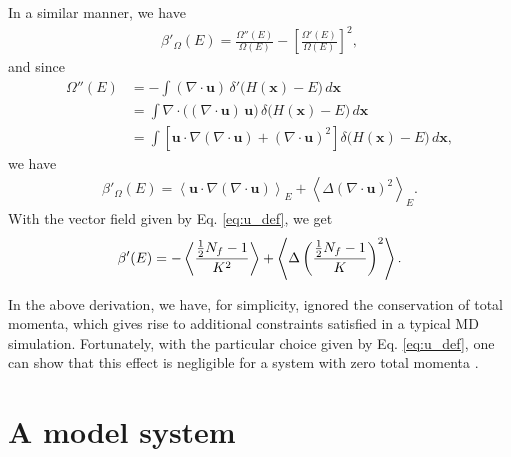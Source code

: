 \documentclass[preprint]{revtex4-1}
\begin{document}
In a similar manner, we have
%
\begin{align*}
  \beta'_\Omega(E)
  =
  \frac
  {
    \Omega''(E)
  }
  {
    \Omega(E)
  }
  -
  \left[
    \frac
    {
      \Omega'(E)
    }
    {
      \Omega(E)
    }
  \right]^2
  ,
\end{align*}
%
and since
%
\begin{align*}
  \Omega''(E)
  &= -\int
      \left( \nabla \cdot \mathbf u \right) \,
      \delta'\bigl( H(\mathbf x) - E \bigr) \, d\mathbf x
  \\
  &= \int
     \nabla \cdot \bigl( (\nabla \cdot \mathbf u) \, \mathbf u \bigr) \,
     \delta\bigl( H(\mathbf x) - E \bigr) \, d\mathbf x
  \\
  &= \int
     \left[
     \mathbf u \cdot \nabla (\nabla \cdot \mathbf u)
     +
     (\nabla \cdot \mathbf u)^2
     \right]
     \delta\bigl( H(\mathbf x) - E \bigr) \, d\mathbf x
  ,
\end{align*}
%
we have
%
\begin{align*}
  \beta'_\Omega(E)
  =
  \left\langle
     \mathbf u \cdot \nabla (\nabla \cdot \mathbf u)
  \right\rangle_E
  +
  \left\langle
    \Delta (\nabla \cdot \mathbf u)^2
  \right\rangle_E
  .
\end{align*}
%
With the vector field given by Eq. \eqref{eq:u_def},
we get
\begin{equation}
  \beta'(E)
  =
  -
  \left\langle
    \frac{ \frac{1}{2} N_f - 1 } { K^2 }
  \right\rangle
  +
  \left\langle
    \Delta
    \left(
      \frac{ \frac{1}{2} N_f - 1 } { K }
    \right)^2
  \right\rangle
  .
  \notag
\end{equation}

In the above derivation,
we have, for simplicity, ignored the conservation
of total momenta\cite{shirts2006, uline2008},
which gives rise to additional constraints
satisfied in a typical MD simulation\cite{lado1981, wallace1983}.
%
Fortunately, with the particular choice given by Eq. \eqref{eq:u_def},
one can show that this effect is negligible for a system
with zero total momenta\cite{uline2008}
\big[a key observation here is
that for the total momenta $P_\nu = \sum_{i} p_{i, \nu}$,
$\nu = x,y,z$, we have
$\mathbf u \cdot \nabla P_\nu = P_\nu/(2K) = 0$\big].






\section{\label{sec:model}A model system}
\end{document}

